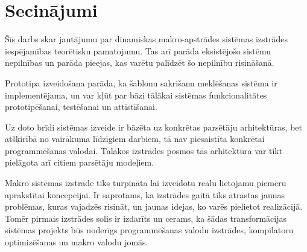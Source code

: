 \documentclass[12pt, a4paper]{article}
\begin{document}
\titullapa



\setcounter{tocdepth}{4}
\tableofcontents















\section*{Secinājumi}
\label{s:conclusions}

Šīs darbs skar jautājumu par dinamiskas makro-apstrādes sistēmas izstrādes iespējamības teorētisku pamatojumu. Tas arī parāda eksistējošo sistēmu nepilnības un parāda pieejas, kas varētu palīdzēt šo nepilnību risināšanā.

Prototipa izveidošana parāda, ka šablonu sakrišanu meklēšanas sistēma ir implementējama, un var kļūt par bāzi tālākai sistēmas funkcionalitātes prototipēšanai, testēšanai un attīstīšanai. 

Uz doto brīdi sistēmas izveide ir bāzēta uz konkrētas parsētāju arhitektūras, bet atšķirībā no vairākuma līdzīgiem darbiem, tā nav piesaistīta konkrētai programmēšanas valodai. Tālākos izstrādes posmos tās arhitektūra var tikt pielāgota arī citiem parsētāju modeļiem.

Makro sistēmas izstrāde tiks turpināta lai izveidotu reālu lietojamu piemēru aprakstītai koncepcijai. Ir saprotams, ka izstrādes gaitā tiks atrastas jaunas problēmas, kuras vajadzēs risināt, un jaunas idejas, ko varēs pielietot realizācijā. Tomēr pirmais izstrādes solis ir izdarīts un cerams, ka šādas transformācijas sistēmas projekts būs noderīgs programmēšanas valodu izstrādes, kompilatoru optimizēšanas un makro valodu jomās.
%
%

\end{document}
